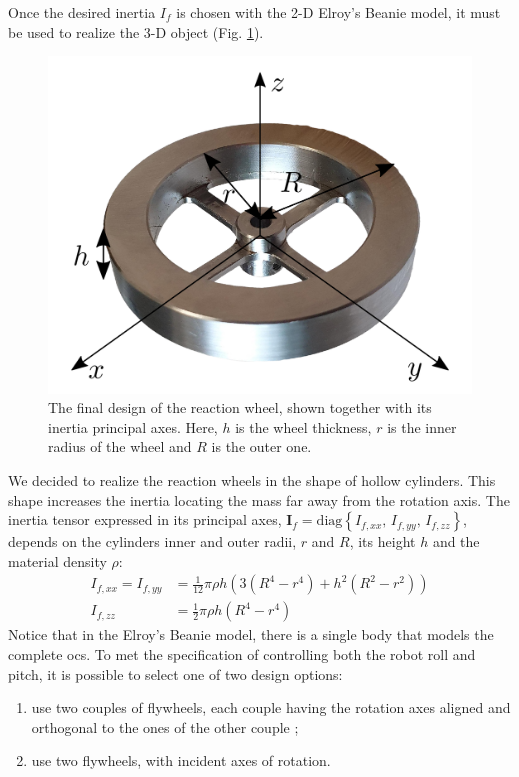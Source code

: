 \documentclass[letterpaper, 10 pt, conference]{ieeeconf}  %
\begin{document}
Once the desired inertia $I_f$ is chosen with the 2-D Elroy's Beanie model, it must be used to realize the 3-D object (Fig. \ref{fig:flywheel}). 
\begin{figure}
	\centering
	\includegraphics[width=0.7\linewidth]{figures/flywheel.png}
	\caption{\small The final design of the reaction wheel, shown together with its inertia principal axes. Here, $h$ is the wheel thickness, $r$ is the inner radius of the wheel and $R$ is the outer one. }
	\label{fig:flywheel}
\end{figure}
We decided to realize the reaction wheels in the shape of hollow cylinders. This shape increases the inertia locating the mass far away from the rotation axis. The inertia tensor expressed in its principal axes, $\bm{I}_f = \mathrm{diag}\left\{ I_{f, xx}, \, I_{f, yy}, \, I_{f, zz}  \right\}$, depends on the cylinders inner and outer radii, $r$ and $R$, its height $h$ and the material density $\rho$:
\begin{equation}
	\begin{split}
	I_{f, xx} = I_{f, yy} &= \frac{1}{12}\pi \rho h \left(3\left(R^4 - r^4\right) + h^2\left(R^2 - r^2\right)\right) \\
	I_{f, zz} &= \frac{1}{2}\pi \rho h \left(R^4 - r^4\right)
	\end{split}
\end{equation}
Notice that in the Elroy's Beanie model, there is a single body that models the complete \gls{ocs}. To met the specification of controlling both the robot roll and pitch, it is possible to select one of two design options:
\begin{enumerate}
	\item use two couples of flywheels, each couple having the rotation axes aligned and orthogonal to the ones of the other couple ;
	\item use two flywheels, with incident axes of rotation.
\end{enumerate}
\end{document}
